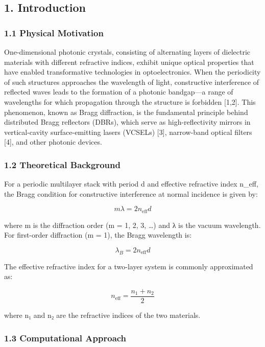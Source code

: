 \documentclass[
]{article}
\begin{document}
\subsection{1. Introduction}\label{introduction}

\subsubsection{1.1 Physical Motivation}\label{physical-motivation}

One-dimensional photonic crystals, consisting of alternating layers of
dielectric materials with different refractive indices, exhibit unique
optical properties that have enabled transformative technologies in
optoelectronics. When the periodicity of such structures approaches the
wavelength of light, constructive interference of reflected waves leads
to the formation of a photonic bandgap---a range of wavelengths for
which propagation through the structure is forbidden {[}1,2{]}. This
phenomenon, known as Bragg diffraction, is the fundamental principle
behind distributed Bragg reflectors (DBRs), which serve as
high-reflectivity mirrors in vertical-cavity surface-emitting lasers
(VCSELs) {[}3{]}, narrow-band optical filters {[}4{]}, and other
photonic devices.

\subsubsection{1.2 Theoretical Background}\label{theoretical-background}

For a periodic multilayer stack with period d and effective refractive
index n\_eff, the Bragg condition for constructive interference at
normal incidence is given by:

\[m\lambda = 2n_{\text{eff}}d\]

where m is the diffraction order (m = 1, 2, 3, \ldots) and λ is the
vacuum wavelength. For first-order diffraction (m = 1), the Bragg
wavelength is:

\[\lambda_B = 2n_{\text{eff}}d\]

The effective refractive index for a two-layer system is commonly
approximated as:

\[n_{\text{eff}} = \frac{n_1 + n_2}{2}\]

where n₁ and n₂ are the refractive indices of the two materials.

\subsubsection{1.3 Computational Approach}\label{computational-approach}
\end{document}
